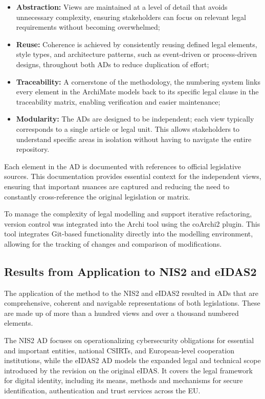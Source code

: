 \begin{itemize}
    \item \textbf{Abstraction:} Views are maintained at a level of detail that avoids unnecessary complexity, ensuring stakeholders can focus on relevant legal requirements without becoming overwhelmed;
    \item \textbf{Reuse:} Coherence is achieved by consistently reusing defined legal elements, style types, and architecture patterns, such as event-driven or process-driven designs, throughout both \ac{AD}s to reduce duplication of effort;
    \item \textbf{Traceability:} A cornerstone of the methodology, the numbering system links every element in the ArchiMate models back to its specific legal clause in the traceability matrix, enabling verification and easier maintenance;
    \item \textbf{Modularity:} The \ac{AD}s are designed to be independent; each view typically corresponds to a single article or legal unit. This allows stakeholders to understand specific areas in isolation without having to navigate the entire repository.
\end{itemize}

Each element in the \ac{AD} is documented with references to official legislative sources. This documentation provides essential context for the independent views, ensuring that important nuances are captured and reducing the need to constantly cross-reference the original legislation or matrix.

To manage the complexity of legal modelling and support iterative refactoring, version control was integrated into the Archi tool using the coArchi2 plugin. This tool integrates Git-based functionality directly into the modelling environment, allowing for the tracking of changes and comparison of modifications.

\subsection{Results from Application to NIS2 and eIDAS2}

The application of the method to the \ac{NIS2} and \ac{eIDAS2} resulted in \ac{AD}s that are comprehensive, coherent and navigable representations of both legislations. These are made up of more than a hundred views and over a thousand numbered elements.

The \ac{NIS2} \ac{AD} focuses on operationalizing cybersecurity obligations for essential and important entities, national \ac{CSIRT}s, and European-level cooperation institutions, while the \ac{eIDAS2} \ac{AD} models the expanded legal and technical scope introduced by the revision on the original eIDAS. It covers the legal framework for digital identity, including its means, methods and mechanisms for secure identification, authentication and trust services across the \ac{EU}.

